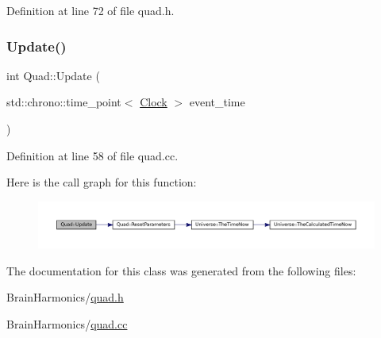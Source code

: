 Definition at line 72 of file quad.\+h.

\mbox{\label{class_quad_a0710e6a7d77a34fdadbd2c36d03ade62}} 
\subsubsection{\texorpdfstring{Update()}{Update()}}
{\footnotesize\ttfamily int Quad\+::\+Update (\begin{DoxyParamCaption}\item[{std\+::chrono\+::time\+\_\+point$<$ \mbox{\hyperlink{universe_8h_a0ef8d951d1ca5ab3cfaf7ab4c7a6fd80}{Clock}} $>$}]{event\+\_\+time }\end{DoxyParamCaption})}



Definition at line 58 of file quad.\+cc.

Here is the call graph for this function\+:\nopagebreak
\begin{figure}[H]
\begin{center}
\leavevmode
\includegraphics[width=350pt]{class_quad_a0710e6a7d77a34fdadbd2c36d03ade62_cgraph}
\end{center}
\end{figure}


The documentation for this class was generated from the following files\+:\begin{DoxyCompactItemize}
\item 
Brain\+Harmonics/\mbox{\hyperlink{quad_8h}{quad.\+h}}\item 
Brain\+Harmonics/\mbox{\hyperlink{quad_8cc}{quad.\+cc}}\end{DoxyCompactItemize}
